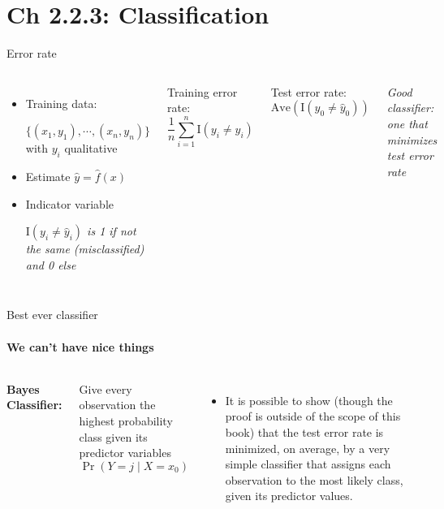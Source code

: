 \documentclass[aspectratio=169,usenames,dvipsnames]{beamer}
\newcommand{\InstructorNotes}[1]{\textit{\color{orange}#1}}
\newcommand{\InstructorList}[1]{
\begin{itemize}
	\color{orange}
	#1
\end{itemize}
}
\begin{document}
\section{Ch 2.2.3: Classification}
\begin{frame}[t]{Error rate}



\begin{columns}
\centering
\begin{itemize}
	\item
Training data:

$\{ (x_1,y_1),\cdots,(x_n,y_n) \}$ with $y_i$ qualitative

\item Estimate $\hat y = \hat f (x)$
\item Indicator variable

\InstructorNotes{$\mathrm{I}(y_i \neq \hat y_i)$ is 1 if not the same (misclassified) and 0 else}
\end{itemize}

Training error rate:
\begin{equation*}
\frac{1}{n} \sum_{i = 1}^n \mathrm{I}(y_i \neq \hat y_i)
\end{equation*}

Test error rate:
\begin{equation*}
	\mathrm{Ave}(\mathrm{I} (y_0 \neq \hat y_0))
\end{equation*}

\InstructorNotes{Good classifier: one that minimizes test error rate}

\end{columns}

\end{frame}


\begin{frame}[c]{Best ever classifier }
	\framesubtitle{We can't have nice things}

\begin{columns}
\textbf{Bayes Classifier:}

Give every observation the highest probability class given its predictor variables
\begin{equation*}
	\Pr (Y = j \mid X = x_0)
\end{equation*}
\centering
\InstructorList{
  \item It is possible to show (though the proof is outside of the scope of this
  book) that the test error rate  is minimized, on average, by a
  very simple classifier that assigns each observation to the most likely class,
  given its predictor values.
}

\end{columns}

\end{frame}
\end{document}
